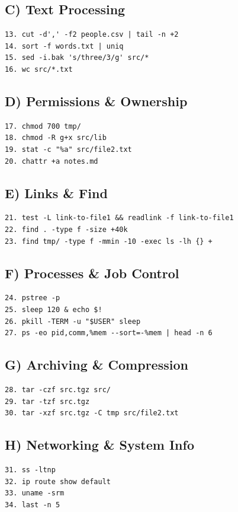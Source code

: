 \subsection*{C) Text Processing}
\begin{verbatim}
13. cut -d',' -f2 people.csv | tail -n +2
14. sort -f words.txt | uniq
15. sed -i.bak 's/three/3/g' src/*
16. wc src/*.txt
\end{verbatim}

\subsection*{D) Permissions \& Ownership}
\begin{verbatim}
17. chmod 700 tmp/
18. chmod -R g+x src/lib
19. stat -c "%a" src/file2.txt
20. chattr +a notes.md
\end{verbatim}

\subsection*{E) Links \& Find}
\begin{verbatim}
21. test -L link-to-file1 && readlink -f link-to-file1
22. find . -type f -size +40k
23. find tmp/ -type f -mmin -10 -exec ls -lh {} +
\end{verbatim}

\subsection*{F) Processes \& Job Control}
\begin{verbatim}
24. pstree -p
25. sleep 120 & echo $!
26. pkill -TERM -u "$USER" sleep
27. ps -eo pid,comm,%mem --sort=-%mem | head -n 6
\end{verbatim}

\subsection*{G) Archiving \& Compression}
\begin{verbatim}
28. tar -czf src.tgz src/
29. tar -tzf src.tgz
30. tar -xzf src.tgz -C tmp src/file2.txt
\end{verbatim}

\subsection*{H) Networking \& System Info}
\begin{verbatim}
31. ss -ltnp
32. ip route show default
33. uname -srm
34. last -n 5
\end{verbatim}

